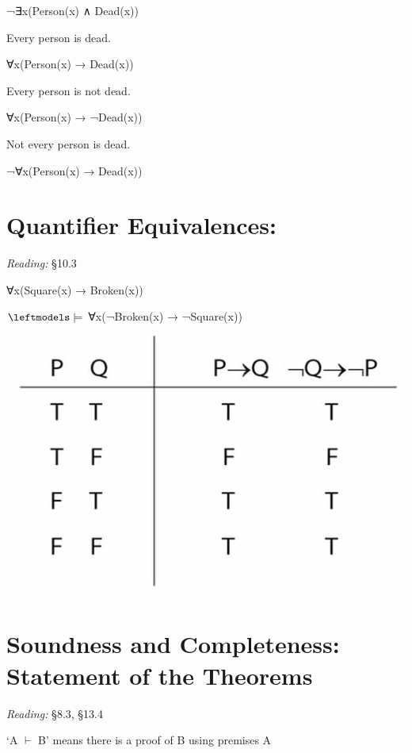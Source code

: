 \documentclass[12pt]{extarticle}
\begin{document}
\begin{multicols*}{3}
\hspace{5mm} ¬∃x(Person(x) ∧ Dead(x))
 
Every person is dead.
 
\hspace{5mm} ∀x(Person(x) → Dead(x))
 
Every person is not dead.
 
\hspace{5mm} ∀x(Person(x) → ¬Dead(x))
 
Not every person is dead.
 
\hspace{5mm} ¬∀x(Person(x) → Dead(x))
 
 
 
\section{Quantifier Equivalences: }
 
\emph{Reading:} §10.3
 
 ∀x(Square(x) → Broken(x)) 
 
 \hspace{5mm} $\leftmodels\models$ ∀x(¬Broken(x) → ¬Square(x))
 
\begin{center}
\includegraphics[scale=0.3]{img/unit_760_tt.png}
\end{center}
 
 
\section{Soundness and Completeness: Statement of the Theorems}
 
\emph{Reading:} §8.3, §13.4
 
‘A $\vdash$ B’ means there is a proof of B using premises A
 

\end{multicols*}
\end{document}
